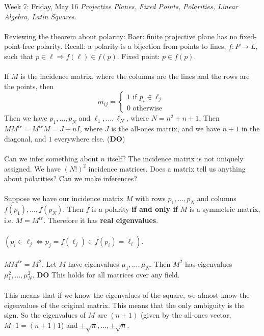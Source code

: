 \documentclass[12pt]{article}
\theoremstyle{remark}
\newcommand{\IF}{\text{ if }}
\newcommand{\ow}{\text{ otherwise }}
\begin{document}
\label{21}\begin{section}{Week 7: Friday, May 16}
\indent\textit{Projective Planes, Fixed Points, Polarities, Linear Algebra, Latin Squares.}
\\\\
Reviewing the theorem about polarity: Baer: finite projective plane has no fixed-point-free polarity. Recall: a polarity is a bijection from points to lines, $f:P \to L$, such that $p \in \ell \Rightarrow f(\ell) \in f(p)$. Fixed point: $p \in f(p)$. 
\\\\
If $M$ is the incidence matrix, where the columns are the lines and the rows are the points, then $$m_{ij} = \begin{cases} 1 \IF p_i \in \ell_j \\ 0 \ow \end{cases}$$
Then we have $p_1,\ldots,p_N$ and $\ell_1,\ldots,\ell_N$, where $N = n^2 + n + 1$. Then $MM^{tr} = M^{tr}M = J + nI$, where $J$ is the all-ones matrix, and we have $n+1$ in the diagonal, and $1$ everywhere else. (\textbf{DO})
\\\\
Can we infer something about $n$ itself? The incidence matrix is not uniquely assigned. We have $(N!)^2$ incidence matrices. Does a matrix tell us anything about polarities? Can we make inferences?
\\\\
Suppose we have our incidence matrix $M$ with rows $p_1,\ldots,p_N$ and columns $f(p_1),\ldots,f(p_N)$. Then $f$ is a polarity \textbf{if and only if} $M$ is a symmetric matrix, i.e. $M = M^{tr}$. Therefore it has \textbf{real eigenvalues}.
\\\\$(p_i \in \ell_j \Leftrightarrow p_j = f(\ell_j) \in f(p_i) = \ell_i)$.
\\\\
$MM^{tr} = M^2$. Let $M$ have eigenvalues $\mu_1,\ldots,\mu_N$. Then $M^2$ has eigenvalues $\mu_1^2,\ldots,\mu_N^2$. \textbf{DO} This holds for all matrices over any field.
\\\\
This means that if we know the eigenvalues of the square, we almost know the eigenvalues of the original matrix. This means that the only ambiguity is the sign. So the eigenvalues of $M$ are $(n+1)$ (given by the all-ones vector, $M\cdot 1 = (n+1) 1$) and $\pm \sqrt{n},\ldots,\pm \sqrt{n}$.
\\\\

\end{section}
\end{document}
